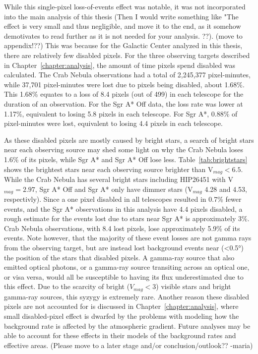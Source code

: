     {\color{red}While this single-pixel loss-of-events effect was notable, it was not incorporated into the main analysis of this thesis (Then I would write something like "The effect is very small and thus negligible, and move it to the end, as it somehow demotivates to read further as it is not needed for your analysis. ??)}.
    {\color{red}(move to appendix!??)}
    This was because for the Galactic Center analyzed in this thesis, there are relatively few disabled pixels.
    For the three observing targets described in Chapter~\ref{chapter:analysis}, the amount of time pixels spend disabled was calculated.
    The Crab Nebula observations had a total of 2,245,377 pixel-minutes, while 37,701 pixel-minutes were lost due to pixels being disabled, about 1.68\%.
    This 1.68\% equates to a loss of 8.4 pixels (out of 499) in each telescope for the duration of an observation.
    For the Sgr A* Off data, the loss rate was lower at 1.17\%, equivalent to losing 5.8 pixels in each telescope.
    For Sgr A*, 0.88\% of pixel-minutes were lost, equivalent to losing 4.4 pixels in each telescope.

    As these disabled pixels are mostly caused by bright stars, a search of bright stars near each observing source may shed some light on why the Crab Nebula loses 1.6\% of its pixels, while Sgr A* and Sgr A* Off lose less.
    Table~\ref{tab:brightstars} shows the brightest stars near each observing source brighter than V${}_{mag}<6.5$.
    While the Crab Nebula has several bright stars including HIP26451 with V${}_{mag} = 2.97$, Sgr A* Off and Sgr A* only have dimmer stars (V${}_{mag}$ 4.28 and 4.53, respectivly).
    Since a one pixel disabled in all telescopes resulted in 0.7\% fewer events, and the Sgr A* observations in this analysis have \nicetilde{}4.4 pixels disabled, a rough estimate for the events lost due to stars near Sgr A* is approximately 3\%.
    Crab Nebula observations, with 8.4 lost pixels, lose approximately 5.9\% of its events.
    Note however, that the majority of these event losses are not gamma rays from the observing target, but are instead lost background events near (<\ang{0.5}) the position of the stars that disabled pixels.
    A gamma-ray source that also emitted optical photons, or a gamma-ray source transiting across an optical one, or visa versa, would all be susceptible to having its flux underestimated due to this effect.
    Due to the scarcity of bright ($V_{mag}<3$) visible stars and bright gamma-ray sources, this syzygy is extremely rare.
    {\color{red}Another reason these disabled pixels are not accounted for is discussed in Chapter~\ref{chapter:analysis}, where small disabled-pixel effect is dwarfed by the problems with modeling how the background rate is affected by the atmospheric gradient.
    Future analyses may be able to account for these effects in their models of the background rates and effective areas.
    (Please move to a later stage and/or conclusion/outlook?? -maria)}

